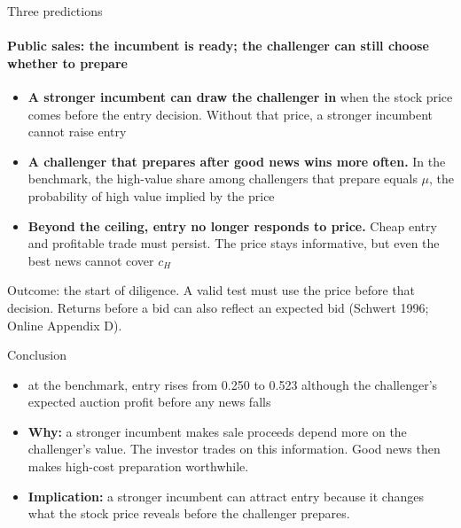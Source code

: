 \documentclass[10pt,aspectratio=169]{beamer}
\newcommand{\GrayLine}[1]{\par{\color{cGrayText}\footnotesize #1\par}}
\begin{document}
\begin{frame}[label=F15]{Three predictions}
\framesubtitle{Public sales: the incumbent is ready; the challenger can still choose whether to prepare}
\begin{itemize}\setlength{\itemsep}{8pt}
\item \textbf{A stronger incumbent can draw the challenger in} when the stock price comes before the entry decision. Without that price, a stronger incumbent cannot raise entry
\item \textbf{A challenger that prepares after good news wins more often.} In the benchmark, the high-value share among challengers that prepare equals $\mu$, the probability of high value implied by the price
\item \textbf{Beyond the ceiling, entry no longer responds to price.} Cheap entry and profitable trade must persist. The price stays informative, but even the best news cannot cover $c_H$
\end{itemize}
\medskip
\GrayLine{Outcome: the start of diligence. A valid test must use the price before that decision. Returns before a bid can also reflect an expected bid (Schwert 1996; Online Appendix D).}
\end{frame}

\begin{frame}[label=F16]{Conclusion}
\begin{itemize}\setlength{\itemsep}{20pt}
\item {} at the benchmark, entry rises from 0.250 %
to 0.523 %
although the challenger's expected auction profit before any news falls
\item \textbf{Why:} a stronger incumbent makes sale proceeds depend more on the challenger's value. The investor trades on this information. Good news then makes high-cost preparation worthwhile.
\item \textbf{Implication:} a stronger incumbent can attract entry because it changes what the stock price reveals before the challenger prepares.
\end{itemize}
\end{frame}
\end{document}
